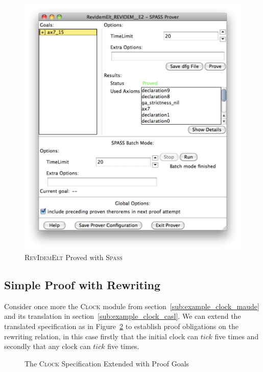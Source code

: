\documentclass[11pt]{article}
\newcommand{\Spass}{\textsc{Spass}}
\begin{document}
\begin{figure}
\begin{minipage}[b]{0.5\textwidth}
\begin{centering}
      \includegraphics[width=\textwidth]{RevElt-spass.pdf}
      \caption{\textsc{RevIdemElt} Proved with \Spass{}}\label{fig:revelt-spass}
    \end{centering}
  \end{minipage}
\end{figure}

\clearpage

\subsection{Simple Proof with Rewriting}
\label{sub:sub_results_proof_rewrite}

Consider once more the \textsc{Clock} module from section~\ref{sub:example_clock_maude} and its translation in section~\ref{sub:example_clock_casl}. We can extend the translated specification as in Figure~\ref{fig:spec-clock-rewrite} to establish proof obligations on the rewriting relation, in this case firstly that the initial clock can $tick$ five times and secondly that any clock can $tick$ five times.

\begin{figure}
  
  \caption{The \textsc{Clock} Specification Extended with Proof Goals}\label{fig:spec-clock-rewrite}
\end{figure}
\end{document}
